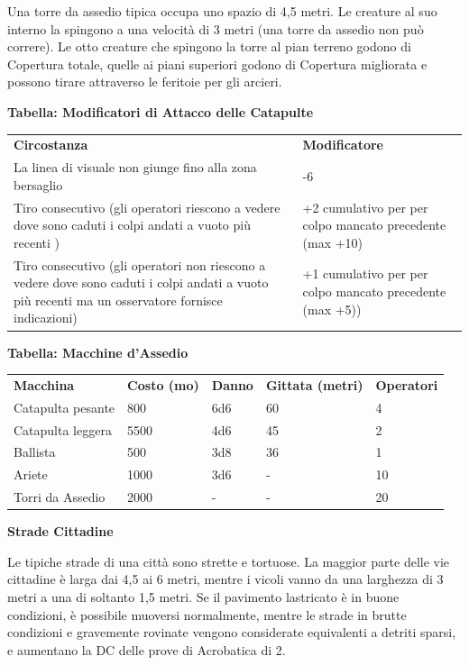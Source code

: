 \documentclass[a4paper,11pt,twoside,openany]{book}
\begin{document}
Una torre da assedio tipica occupa uno spazio di 4,5 metri. Le creature al suo interno la spingono a una velocità di 3 metri (una torre da assedio non può correre). Le otto creature che spingono la torre al pian terreno godono di Copertura totale, quelle ai piani superiori godono di Copertura migliorata e possono tirare attraverso le feritoie per gli arcieri.

\bigskip

\textbf{Tabella: Modificatori di Attacco delle Catapulte}

\begin{tabularx}{\textwidth}{XX}
	\toprule
	\textbf{Circostanza}      & \textbf{Modificatore}\tabularnewline
	La linea di visuale non giunge fino alla zona bersaglio & -6\tabularnewline
	Tiro consecutivo (gli operatori riescono a vedere dove sono caduti i colpi andati a vuoto più recenti )   & +2 cumulativo per per colpo  mancato precedente (max +10)\tabularnewline
	Tiro consecutivo (gli operatori non riescono a vedere dove sono caduti i colpi andati a vuoto più recenti ma un osservatore fornisce indicazioni) & +1 cumulativo per per colpo mancato precedente (max +5))\tabularnewline
\end{tabularx}

\bigskip

\textbf{Tabella: Macchine d'Assedio}

\medskip

\begin{tabularx}{\textwidth}{XXXXX}
	\toprule
	\textbf{Macchina} & \textbf{Costo (mo)} & \textbf{Danno} & \textbf{Gittata (metri)} & \textbf{Operatori}\tabularnewline
	Catapulta pesante & 800  & 6d6  & 60   & 4\tabularnewline
	Catapulta leggera & 5500 & 4d6  & 45   & 2\tabularnewline
	Ballista& 500  & 3d8  & 36   & 1\tabularnewline
	Ariete  & 1000 & 3d6  & -    & 10\tabularnewline
	Torri da Assedio  & 2000 & -    & -    & 20\tabularnewline
\end{tabularx}

\bigskip

\textbf{Strade Cittadine}

Le tipiche strade di una città sono strette e tortuose. La maggior parte delle vie cittadine è larga dai 4,5 ai 6 metri, mentre i vicoli vanno da una larghezza di 3 metri a una di soltanto 1,5 metri. Se il pavimento lastricato è in buone condizioni, è possibile muoversi normalmente, mentre le strade in brutte condizioni e gravemente rovinate vengono considerate equivalenti a detriti sparsi, e aumentano la DC delle prove di Acrobatica di 2.
\end{document}
